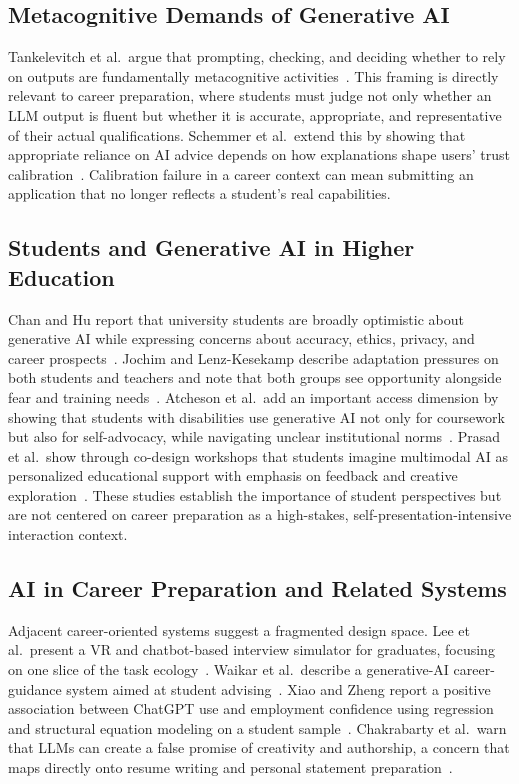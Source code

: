 \documentclass[sigconf,review,anonymous]{acmart}
\begin{document}
\subsection{Metacognitive Demands of Generative AI}

Tankelevitch et al.\ argue that prompting, checking, and deciding whether to
rely on outputs are fundamentally metacognitive
activities~\cite{tankelevitch2024metacognitive}.  This framing is directly
relevant to career preparation, where students must judge not only whether
an LLM output is fluent but whether it is accurate, appropriate, and
representative of their actual qualifications.  Schemmer et al.\ extend this
by showing that appropriate reliance on AI advice depends on how explanations
shape users' trust calibration~\cite{schemmer2023appropriatereliance}.
Calibration failure in a career context can mean submitting an application
that no longer reflects a student's real capabilities.

\subsection{Students and Generative AI in Higher Education}

Chan and Hu report that university students are broadly optimistic about
generative AI while expressing concerns about accuracy, ethics, privacy, and
career prospects~\cite{chan2023studentsvoices}.  Jochim and Lenz-Kesekamp
describe adaptation pressures on both students and teachers and note that
both groups see opportunity alongside fear and training
needs~\cite{jochim2024teachingtesting}.  Atcheson et al.\ add an important
access dimension by showing that students with disabilities use generative
AI not only for coursework but also for self-advocacy, while navigating
unclear institutional norms~\cite{atcheson2025disabilitygenai}.  Prasad
et al.\ show through co-design workshops that students imagine multimodal
AI as personalized educational support with emphasis on feedback and
creative exploration~\cite{prasad2025multimodal}.  These studies establish
the importance of student perspectives but are not centered on career
preparation as a high-stakes, self-presentation-intensive interaction
context.

\subsection{AI in Career Preparation and Related Systems}

Adjacent career-oriented systems suggest a fragmented design space.  Lee
et al.\ present a VR and chatbot-based interview simulator for graduates,
focusing on one slice of the task ecology~\cite{lee2024vrinterview}.
Waikar et al.\ describe a generative-AI career-guidance system aimed at
student advising~\cite{waikar2024careerguidance}.  Xiao and Zheng report a
positive association between ChatGPT use and employment confidence using
regression and structural equation modeling on a student
sample~\cite{xiao2025employmentconfidence}.  Chakrabarty et al.\ warn that
LLMs can create a false promise of creativity and authorship, a concern that
maps directly onto resume writing and personal statement
preparation~\cite{chakrabarty2024artorartifice}.
\end{document}
